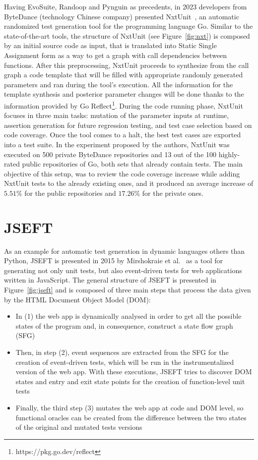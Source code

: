 \documentclass[%
  chapterprefix=false,%
  open=right,%
  twoside=true,%
  paper=a4,%
  logofile={Figures/logo.png},%
  thesistype=master,%
  UKenglish,%
]{se2thesis}
\begin{document}
Having EvoSuite, Randoop and Pynguin as precedents, in 2023 developers from ByteDance (technology Chinese company) presented NxtUnit~\cite{DBLP:conf/ease/WangMCGSP23}, an automatic randomized test generation tool for the programming language Go.
Similar to the state-of-the-art tools, the structure of NxtUnit (see Figure~\ref{fig:nxt}) is composed by an initial source code as input, that is translated into Static Single Assignment form as a way to get a graph with call dependencies between functions.
After this preprocessing, NxtUnit proceeds to synthesize from the call graph a code template that will be filled with appropriate randomly generated parameters and ran during the tool's execution.
All the information for the template synthesis and posterior parameter changes will be done thanks to the information provided by Go Reflect\footnote{https://pkg.go.dev/reflect}.
During the code running phase, NxtUnit focuses in three main tasks: mutation of the parameter inputs at runtime, assertion generation for future regression testing, and test case selection based on code coverage.
Once the tool comes to a halt, the best test cases are exported into a test suite.
In the experiment proposed by the authors, NxtUnit was executed on 500 private ByteDance repositories and 13 out of the 100 highly-rated public repositories of Go, both sets that already contain tests.
The main objective of this setup, was to review the code coverage increase while adding NxtUnit tests to the already existing ones, and it produced an average increase of \(5.51\%\) for the public repositories and \(17.26\%\) for the private ones.

\section{JSEFT}

As an example for automatic test generation in dynamic languages others than Python, JSEFT is presented in 2015 by Mirshokraie et al.~\cite{DBLP:conf/icst/Mirshokraie0P15} as a tool for generating not only unit tests, but also event-driven tests for web applications written in JavaScript.
The general structure of JSEFT is presented in Figure~\ref{fig:jseft} and is composed of three main steps that process the data given by the HTML Document Object Model (DOM):
\begin{itemize}
  \item In (1) the web app is dynamically analysed in order to get all the possible states of the program and, in consequence, construct a state flow graph (SFG)
  \item Then, in step (2), event sequences are extracted from the SFG for the creation of event-driven tests, which will be run in the instrumentalized version of the web app.
  With these executions, JSEFT tries to discover DOM states and entry and exit state points for the creation of function-level unit tests
  \item Finally, the third step (3) mutates the web app at code and DOM level, so functional oracles can be created from the difference between the two states of the original and mutated tests versions
\end{itemize}
\end{document}
